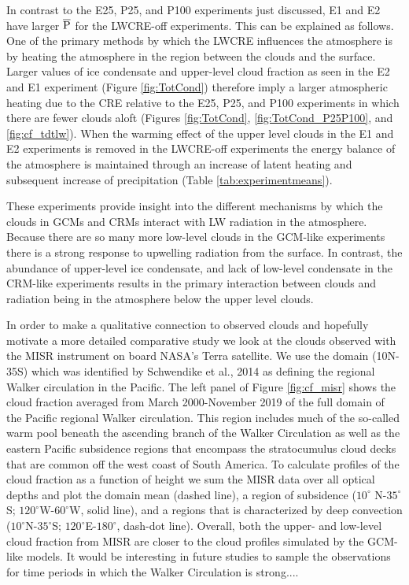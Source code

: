 \documentclass[draft]{agujournal2019}
\begin{document}
{In contrast to the E25, P25, and P100 experiments just discussed, 
E1 and E2 have larger $\overline{\rm{P}}$ for the LWCRE-off experiments.  This can be explained as follows.  
One of the primary methods by which the LWCRE influences the atmosphere is by 
heating the atmosphere in the region between the clouds and the surface.  
Larger values of ice condensate and upper-level cloud fraction as seen in the E2 and E1 experiment 
(Figure \ref{fig:TotCond}) therefore imply a larger atmospheric heating due to the CRE relative to the 
E25, P25, and P100 experiments in which there are fewer clouds aloft (Figures \ref{fig:TotCond}, 
\ref{fig:TotCond_P25P100}, and \ref{fig:cf_tdtlw}).  When the warming effect of the upper level clouds 
in the E1 and E2 experiments is removed in the LWCRE-off experiments the energy balance of 
the atmosphere is maintained through an increase of latent heating and subsequent increase 
of precipitation (Table \ref{tab:experimentmeans}).  

These experiments provide insight into the different mechanisms by which the clouds in GCMs and CRMs
interact with LW radiation in the atmosphere.  Because there are so many more low-level clouds in 
the GCM-like experiments there is a strong response to upwelling radiation from the surface.  In contrast, 
the abundance of upper-level ice condensate, and lack of low-level condensate in the CRM-like experiments 
results in the primary interaction between clouds and radiation being in the atmosphere below the upper level clouds.       

In order to make a qualitative connection to observed clouds and hopefully motivate a more detailed comparative study we look at the clouds observed with the MISR instrument 
  on board NASA's Terra satellite.  We use the domain (10N-35S) which was identified by Schwendike et al., 2014 as defining the regional Walker circulation in the Pacific.  
  The left panel of Figure \ref{fig:cf_misr} shows the cloud fraction averaged from March 2000-November 2019 of the full domain of the Pacific regional Walker circulation.  This region 
  includes much of the so-called warm pool beneath the ascending branch of the Walker Circulation as well as the eastern Pacific subsidence regions that encompass the stratocumulus
  cloud decks that are common off the west coast of South America.   To calculate profiles of the cloud fraction as a function of height we sum the MISR data over all optical depths 
  and plot the domain mean (dashed line), a region of subsidence ($10^\circ$ N-$35^\circ$S; $120^\circ$W-$60^\circ$W, solid line), and a regions that is characterized by deep 
  convection ($10^\circ$N-$35^\circ$S; $120^\circ$E-$180^\circ$, dash-dot line).  Overall, both the upper- and low-level cloud fraction from MISR are closer to the cloud profiles 
  simulated by the GCM-like models.  It would be interesting in future studies to sample the observations for time periods in which the Walker Circulation is strong.... 

}
\end{document}
